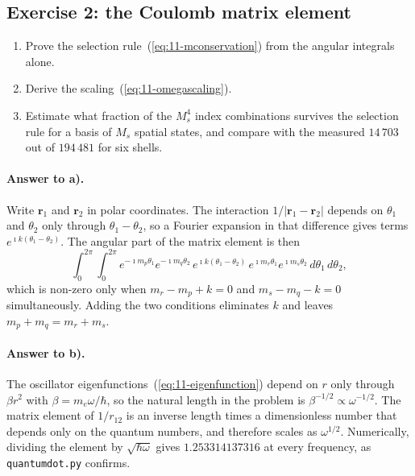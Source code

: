 \subsection*{Exercise 2: the Coulomb matrix element}
\label{ex:11-coulomb}

\begin{enumerate}
  \item[a)] Prove the selection rule~(\ref{eq:11-mconservation}) from the
  angular integrals alone.
  \item[b)] Derive the scaling~(\ref{eq:11-omegascaling}).
  \item[c)] Estimate what fraction of the $M_s^4$ index combinations survives
  the selection rule for a basis of $M_s$ spatial states, and compare with the
  measured $14\,703$ out of $194\,481$ for six shells.
\end{enumerate}

\paragraph{Answer to a).}
Write $\bm{r}_1$ and $\bm{r}_2$ in polar coordinates.  The interaction
$1/|\bm{r}_1-\bm{r}_2|$ depends on $\theta_1$ and $\theta_2$ only through
$\theta_1-\theta_2$, so a Fourier expansion in that difference gives terms
$e^{\imath k(\theta_1-\theta_2)}$.  The angular part of the matrix element is
then
\[
  \int_0^{2\pi}\!\!\!\int_0^{2\pi}
    e^{-\imath m_p\theta_1}e^{-\imath m_q\theta_2}\,
    e^{\imath k(\theta_1-\theta_2)}\,
    e^{\imath m_r\theta_1}e^{\imath m_s\theta_2}
    \,d\theta_1\,d\theta_2 ,
\]
which is non-zero only when $m_r-m_p+k=0$ and $m_s-m_q-k=0$ simultaneously.
Adding the two conditions eliminates $k$ and leaves $m_p+m_q=m_r+m_s$.

\paragraph{Answer to b).}
The oscillator eigenfunctions~(\ref{eq:11-eigenfunction}) depend on $r$ only
through $\beta r^2$ with $\beta=m_e\omega/\hbar$, so the natural length in the
problem is $\beta^{-1/2}\propto\omega^{-1/2}$.  The matrix element of
$1/r_{12}$ is an inverse length times a dimensionless number that depends only
on the quantum numbers, and therefore scales as $\omega^{1/2}$.  Numerically,
dividing the element by $\sqrt{\hbar\omega}$ gives $1.253314137316$ at every
frequency, as \texttt{quantumdot.py} confirms.

